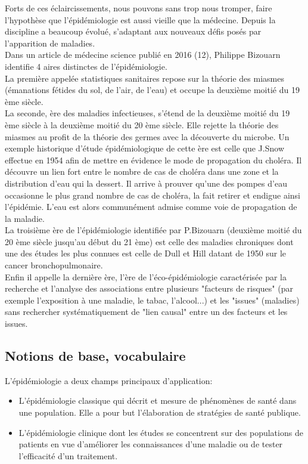 \documentclass{book}
\begin{document}
Forts de ces éclaircissements, nous pouvons sans trop nous tromper, faire l'hypothèse que l'épidémiologie est aussi vieille que la médecine. Depuis la discipline a beaucoup évolué, s'adaptant aux nouveaux défis posés par l'apparition de maladies.\\
Dans un article de médecine science publié en 2016 (12), Philippe Bizouarn identifie 4 aires distinctes de l'épidémiologie.\\
La première appelée statistiques sanitaires repose sur la théorie des miasmes (émanations fétides du sol, de l'air, de l'eau) et occupe la deuxième moitié du 19 ème siècle.\\
La seconde, ère des maladies infectieuses, s'étend de la deuxième moitié du 19 ème siècle à la deuxième moitié du 20 ème siècle. Elle rejette la théorie des miasmes au profit de la théorie des germes avec la découverte du microbe. Un exemple historique d'étude épidémiologique de cette ère est celle que J.Snow effectue en 1954 afin de mettre en évidence le mode de propagation du choléra. Il découvre un lien fort entre le nombre de cas de choléra dans une zone et la distribution d'eau qui la dessert. Il arrive à prouver qu'une des pompes d'eau occasionne le plus grand nombre de cas de choléra, la fait retirer et endigue ainsi l'épidémie. L'eau est alors communément admise comme voie de propagation de la maladie.\\
La troisième ère de l'épidémiologie identifiée par P.Bizouarn (deuxième moitié du 20 ème siècle jusqu'au début du 21 ème) est celle des maladies chroniques dont une des études les plus connues est celle de Dull et Hill datant de 1950 sur le cancer bronchopulmonaire.\\
Enfin il appelle la dernière ère, l'ère de l'éco-épidémiologie caractérisée par la recherche et l'analyse des associations entre plusieurs "facteurs de risques" (par exemple l'exposition à une maladie, le tabac, l'alcool...) et les "issues" (maladies) sans rechercher systématiquement de "lien causal" entre un des facteurs et les issues.\\


\subsection{Notions de base, vocabulaire}
\noindent
L'épidémiologie a deux champs principaux d'application:
\begin{itemize}
\item L'épidémiologie classique qui décrit et mesure de phénomènes de santé dans une population. Elle a pour but l'élaboration de stratégies de santé publique.
\item L'épidémiologie clinique dont les études se concentrent sur des populations de patients en vue d'améliorer les connaissances d'une maladie ou de tester l'efficacité d'un traitement.
\end{itemize}
\end{document}
